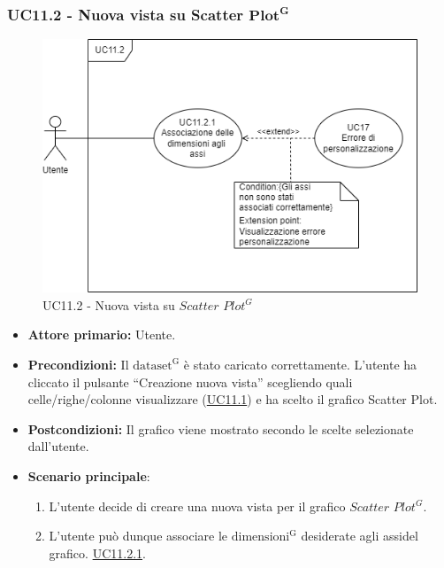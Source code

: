 \subsubsection{UC11.2 - Nuova vista su Scatter ${\mathbf{Plot^{G}}}$}
\label{sec:UC11.2}
\begin{figure}[h!]
	\centering
	\includegraphics[scale=0.60]{../../assets/creazionevista_scatter_plot.png}
	\caption{UC11.2 - Nuova vista su $Scatter$ $Plot^{G}$}
\end{figure}
\begin{itemize}
    \item \textbf{Attore primario:} Utente.
    \item \textbf{Precondizioni:} Il ${\mathrm{dataset^{G}}}$ è stato caricato correttamente. L'utente ha cliccato il pulsante ``Creazione nuova vista'' scegliendo quali celle/righe/colonne visualizzare (\hyperref[sec:UC11.1]{UC11.1}) e ha scelto il grafico Scatter Plot.
    \item \textbf{Postcondizioni:} Il grafico viene mostrato secondo le scelte selezionate dall'utente.
    \item \textbf{Scenario principale}:
    \begin{enumerate}
		\item L'utente decide di creare una nuova vista per il grafico $Scatter$ $Plot^{G}$.
		\item L'utente può dunque associare le ${\mathrm{dimensioni^{G}}}$ desiderate agli assidel grafico. \hyperref[sec:UC11.2.1]{UC11.2.1}.
	\end{enumerate}
\end{itemize}

